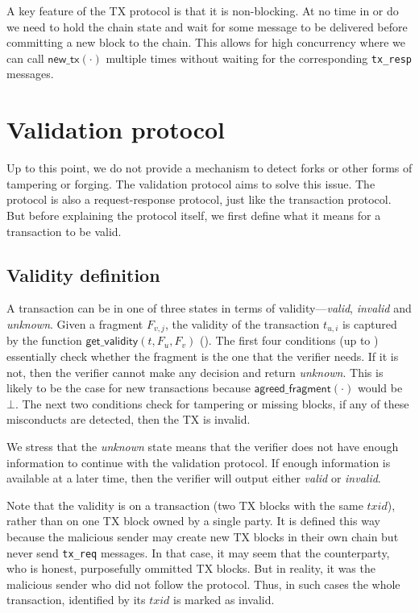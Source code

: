 A key feature of the TX protocol is that it is non-blocking.
At no time in  or  do we need to hold the chain state and wait for some message to be delivered before committing a new block to the chain.
This allows for high concurrency where we can call $\textsf{new\_tx}(\cdot)$ multiple times without waiting for the corresponding \texttt{tx\_resp} messages.

\section{Validation protocol}
\label{sec:vd-protocol}

Up to this point, we do not provide a mechanism to detect forks or other forms of tampering or forging.
The validation protocol aims to solve this issue.
The protocol is also a request-response protocol, just like the transaction protocol.
But before explaining the protocol itself, we first define what it means for a transaction to be valid.

\subsection{Validity definition}
A transaction can be in one of three states in terms of validity---\emph{valid}, \emph{invalid} and \emph{unknown}.
Given a fragment $F_{v, j}$, the validity of the transaction $t_{u, i}$ is captured by the function $\textsf{get\_validity}(t, F_u, F_v)$ ().
The first four conditions (up to ) essentially check whether the fragment is the one that the verifier needs.
If it is not, then the verifier cannot make any decision and return \emph{unknown}.
This is likely to be the case for new transactions because $\textsf{agreed\_fragment}(\cdot)$ would be $\bot$.
The next two conditions check for tampering or missing blocks, if any of these misconducts are detected, then the TX is invalid.

We stress that the \emph{unknown} state means that the verifier does not have enough information to continue with the validation protocol.
If enough information is available at a later time, then the verifier will output either \emph{valid} or \emph{invalid}.

Note that the validity is on a transaction (two TX blocks with the same $txid$), rather than on one TX block owned by a single party.
It is defined this way because the malicious sender may create new TX blocks in their own chain but never send \texttt{tx\_req} messages.
In that case, it may seem that the counterparty, who is honest, purposefully ommitted TX blocks.
But in reality, it was the malicious sender who did not follow the protocol.
Thus, in such cases the whole transaction, identified by its $txid$ is marked as invalid.

